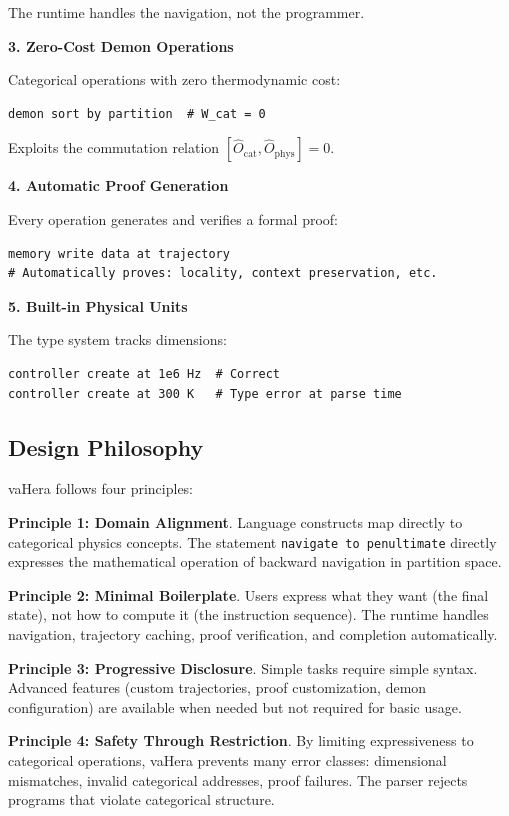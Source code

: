 \documentclass[twocolumn,10pt]{article}
\theoremstyle{definition}
\theoremstyle{remark}
\begin{document}
The runtime handles the navigation, not the programmer.

\textbf{3. Zero-Cost Demon Operations}

Categorical operations with zero thermodynamic cost:
\begin{lstlisting}
demon sort by partition  # W_cat = 0
\end{lstlisting}

Exploits the commutation relation $[\hat{O}_{\text{cat}}, \hat{O}_{\text{phys}}] = 0$.

\textbf{4. Automatic Proof Generation}

Every operation generates and verifies a formal proof:
\begin{lstlisting}
memory write data at trajectory
# Automatically proves: locality, context preservation, etc.
\end{lstlisting}

\textbf{5. Built-in Physical Units}

The type system tracks dimensions:
\begin{lstlisting}
controller create at 1e6 Hz  # Correct
controller create at 300 K   # Type error at parse time
\end{lstlisting}

\subsection{Design Philosophy}

vaHera follows four principles:

\textbf{Principle 1: Domain Alignment}. Language constructs map directly to categorical physics concepts. The statement \texttt{navigate to penultimate} directly expresses the mathematical operation of backward navigation in partition space.

\textbf{Principle 2: Minimal Boilerplate}. Users express what they want (the final state), not how to compute it (the instruction sequence). The runtime handles navigation, trajectory caching, proof verification, and completion automatically.

\textbf{Principle 3: Progressive Disclosure}. Simple tasks require simple syntax. Advanced features (custom trajectories, proof customization, demon configuration) are available when needed but not required for basic usage.

\textbf{Principle 4: Safety Through Restriction}. By limiting expressiveness to categorical operations, vaHera prevents many error classes: dimensional mismatches, invalid categorical addresses, proof failures. The parser rejects programs that violate categorical structure.
\end{document}
